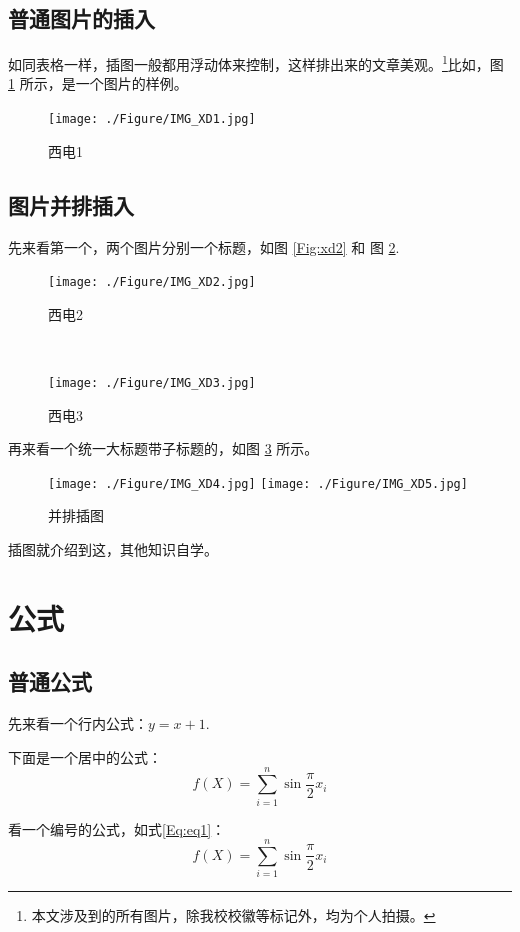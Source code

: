 \subsection{普通图片的插入}
如同表格一样，插图一般都用浮动体来控制，这样排出来的文章美观。\footnote{本文涉及到的所有图片，除我校校徽等标记外，均为个人拍摄。}比如，图 \ref{Fig:xd1} 所示，是一个图片的样例。
\begin{figure}[ht]
  \centering
  \texttt{[image: ./Figure/IMG\_XD1.jpg]}
  \caption{西电1}\label{Fig:xd1}
\end{figure}

\subsection{图片并排插入}

先来看第一个，两个图片分别一个标题，如图 \ref{Fig:xd2} 和 图 \ref{Fig:xd3}.
\begin{figure}[ht]
\centering
\begin{minipage}{.45\textwidth}
\centering
\texttt{[image: ./Figure/IMG\_XD2.jpg]}
  \caption{西电2}\label{Fig:xd2}
\end{minipage}~
\begin{minipage}{.45\textwidth}
\centering
\texttt{[image: ./Figure/IMG\_XD3.jpg]}
  \caption{西电3}\label{Fig:xd3}
\end{minipage}
\end{figure}

再来看一个统一大标题带子标题的，如图 \ref{Fig:bingpai} 所示。
\begin{figure}[ht]
\centering
{}
{\texttt{[image: ./Figure/IMG\_XD4.jpg]}}
{\texttt{[image: ./Figure/IMG\_XD5.jpg]}}
\caption{并排插图}\label{Fig:bingpai}
\end{figure}

插图就介绍到这，其他知识自学。

\section{公式}
\subsection{普通公式}
先来看一个行内公式：$y=x+1$.

下面是一个居中的公式：
\[
f(X)=\sum_{i=1}^{n}\sin{\frac{\pi}{2}x_i}
\]

看一个编号的公式，如式\eqref{Eq:eq1}：
\begin{equation}\label{Eq:eq1}
f(X)=\sum_{i=1}^{n}\sin{\frac{\pi}{2}x_i}
\end{equation}


